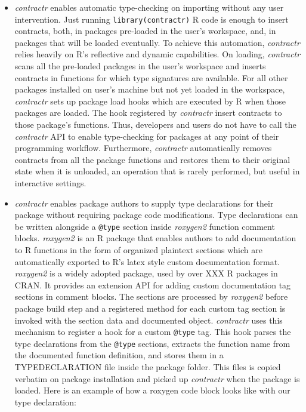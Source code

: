 \documentclass[acmsmall,review,anonymous]{acmart}\settopmatter{printfolios=true,printccs=false,printacmref=false}
\newcommand{\code}[1]{{\lstinline[style=Rin]!#1!}\xspace}
\newcommand{\contractr}{\emph{contractr}\xspace} %
\newcommand{\roxygen}{\emph{roxygen2}\xspace} %
\begin{document}
\begin{itemize}

\item \contractr enables automatic type-checking on importing without
  any user intervention. Just running \code{library(contractr)} R code is enough
  to insert contracts, both, in packages pre-loaded in the user's workspace, and,
  in packages that will be loaded eventually. To achieve this automation,
  \contractr relies heavily on R's reflective and dynamic capabilities. On
  loading, \contractr scans all the pre-loaded packages in the user's workspace
  and inserts contracts in functions for which type signatures are available. For
  all other packages installed on user's machine but not yet loaded in the
  workspace, \contractr sets up package load hooks which are executed by R when
  those packages are loaded. The hook registered by \contractr insert contracts to
  those package's functions. Thus, developers and users do not have to call the
  \contractr API to enable type-checking for packages at any point of their
  programming workflow. Furthermore, \contractr automatically removes contracts
  from all the package functions and restores them to their original state when it
  is unloaded, an operation that is rarely performed, but useful in interactive
  settings.

\item \contractr enables package authors to supply type declarations for their
  package without requiring package code modifications. Type declarations can be
  written alongside a \code{@type} section inside \roxygen function comment
  blocks. \roxygen is an R package that enables authors to add documentation to
  R functions in the form of organized plaintext sections which are
  automatically exported to R's latex style custom documentation format.
  \roxygen is a widely adopted package, used by over XXX R packages in CRAN. It
  provides an extension API for adding custom documentation tag sections in
  comment blocks. The sections are processed by \roxygen before package build
  step and a registered method for each custom tag section is invoked with the
  section data and documented object. \contractr uses this mechanism to register
  a hook for a custom \code{@type} tag. This hook parses the type declarations
  from the \code{@type} sections, extracts the function name from the documented
  function definition, and stores them in a TYPEDECLARATION file inside the
  package folder. This files is copied verbatim on package installation and
  picked up \contractr when the package is loaded. Here is an example of how a
  roxygen code block looks like with our type declaration:


\end{itemize}
\end{document}
